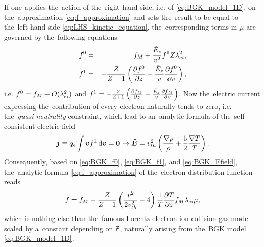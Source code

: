 If one applies the~action of the~right hand side, i.e. of 
\eqref{eq:BGK_model_1D}, 
on the~approximation \eqref{eq:f_approximation} and sets the~result to be equal 
to the~left hand side \eqref{eq:LHS_kinetic_equation}, the~corresponding terms
in $\mu$ are governed by the~following equations
\begin{eqnarray}
  f^0 &=& f_M + \frac{\tilde{E}_z}{v^2}f^1 Z\lambda_{ei}^2 ,
  \label{eq:BGK_f0} \\
  f^1 &=& - \frac{Z}{Z+1}
  \left( \frac{\partial{f^0}}{\partial{z}} + \frac{\tilde{E}_z}{v}\frac{\partial{f^0}}{\partial{v}} \right) , 
  \label{eq:BGK_f1}
\end{eqnarray}
i.e. $f^0 = f_M + O(\lambda_{ei}^2)$ and $f^1 = - \frac{Z}{Z+1}
  \left( \frac{\partial{f_M}}{\partial{z}} + \frac{\tilde{E}_z}{v}\frac{\partial{f_M}}{\partial{v}} \right)$.
Now the~electric current expressing the~contribution of every electron 
naturally tends to zero, i.e. the~\textit{quasi-neutrality} constraint, 
which lead to an~analytic formula of the~self-consistent electric field
\begin{multline}
\boldsymbol{j} \equiv q_e \int \boldsymbol{v} f^1 \, \text{d}\boldsymbol{v} = \boldsymbol{0}  \rightarrow
\boldsymbol{\tilde{E}} = v_{th}^2\left(\frac{\nabla\rho}{\rho} + \frac{5}{2}\frac{\nabla T}{T} 
\right) .
\label{eq:BGK_Efield}
\end{multline}
Consequently, based on \eqref{eq:BGK_f0}, \eqref{eq:BGK_f1}, 
and \eqref{eq:BGK_Efield}, the~analytic formula \eqref{eq:f_approximation}
of the~electron distribution function reads 
\begin{equation}
  \tilde{f} = f_M - \frac{Z}{Z+1}
  \left( \frac{v^2}{2 v_{th}^2} - 4\right)
  \frac{1}{T}\frac{\partial{T}}{\partial{z}}f_M \lambda_{ei} \mu , 
  \label{eq:BGK_approximation}
\end{equation}
which is nothing else than the~famous Lorentz electron-ion collision gas model 
\cite{Lorentz_1905} scaled by a~constant depending on $\Zbar$, 
naturally arising from the~BGK model \eqref{eq:BGK_model_1D}.

